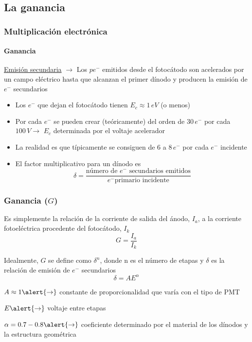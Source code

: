 \documentclass{beamer}
\begin{document}
\subsection{La ganancia}

\begin{frame}
\frametitle{Multiplicaci\'on electr\'onica}
\framesubtitle{Ganancia}
\begin{alertblock}{}
{\color{blue}\underline{Emisi\'on secundaria}} $\rightarrow$ Los $pe^-$ emitidos desde el fotoc\'atodo son acelerados por un campo 
el\'ectrico hasta que alcanzan el primer d\'inodo y producen la emisi\'on de 
$e^-$ secundarios
\end{alertblock}
\begin{itemize}
\item Los $e^-$ que dejan el fotoc\'atodo tienen $E_c \approx 1\,eV$ (o menos) 
\item Por cada $e^-$ se pueden crear (te\'oricamente) del orden de 
$30\,e^-$ por cada $100\,V \rightarrow$ {\color{blue}$E_c$ determinada por el
voltaje acelerador} 
\item \alert{La realidad es que t\'ipicamente se consiguen de 6 a $8\,e^-$ por 
cada $e^-$ incidente}
\item El factor multiplicativo para un d\'inodo es
$$\delta = \frac{\text{n\'umero de $e^-$ secundarios emitidos}}{\text{$e^-$
primario incidente}}$$
\end{itemize}
\end{frame} 

\begin{frame}
\frametitle{Ganancia ($G$)}
\begin{exampleblock}{}
Es simplemente la relaci\'on de la corriente de salida del \'anodo, $I_a$, a 
la corriente fotoel\'ectrica procedente del fotoc\'atodo, $I_k$
$$G = \frac{I_a}{I_k}$$ 
\end{exampleblock}
Idealmente, $G$ se define como {\color{blue}$\delta^n$}, donde {\color{blue}n}
es el n\'umero de etapas y {\color{blue}$\delta$} es la relaci\'on de emisi\'on de $e^-$ secundarios
$$\delta = AE^\alpha$$

$A \approx 1 \alert{\rightarrow}$ constante de proporcionalidad que var\'ia con el tipo de PMT

$E \alert{\rightarrow}$ voltaje entre etapas

$\alpha = 0.7 - 0.8 \alert{\rightarrow}$ coeficiente determinado por el material de los
d\'inodos y la estructura geom\'etrica
\end{frame} 
\end{document}
